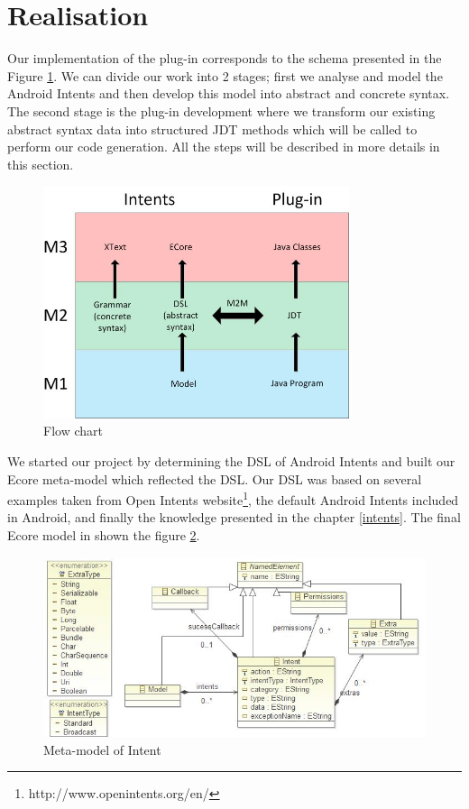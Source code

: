 \section{Realisation}
\label{realisation}

Our implementation of the plug-in corresponds to the schema presented in the Figure \ref{flowchart}. We can divide our work into 2 stages; first we analyse and model the Android Intents and then develop this model into abstract and concrete syntax. The second stage is the plug-in development where we transform our existing abstract syntax data into structured JDT methods which will be called to perform our code generation. All the steps will be described in more details in this section.  

\begin{figure}[t]
\label{flowchart}
  \centering
    \includegraphics[width=0.8\textwidth]{flowchart}
  \caption{Flow chart}
\end{figure}

We started our project by determining the DSL of Android Intents and built our Ecore meta-model which reflected the DSL. Our DSL was based on several examples taken from Open Intents website\footnote{http://www.openintents.org/en/}, the default Android Intents included in Android, and finally the knowledge presented in the chapter \ref{intents}. The final Ecore model in shown the figure \ref{meta-model}.

\begin{figure}[t]
\label{meta-model}
  \centering
    \includegraphics[width=\textwidth]{metamodel}
  \caption{Meta-model of Intent}
\end{figure}

